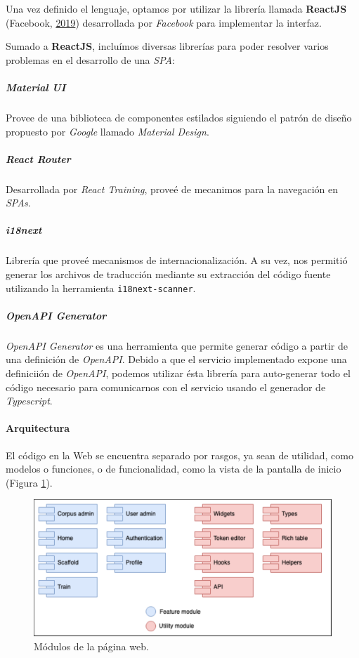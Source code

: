 \documentclass[12pt,a4paper,]{scrartcl}
\let\oldparagraph\paragraph
\renewcommand{\paragraph}[1]{\oldparagraph{#1}\mbox{}}
\let\oldsubparagraph\subparagraph
\renewcommand{\subparagraph}[1]{\oldsubparagraph{#1}\mbox{}}
\begin{document}
Una vez definido el lenguaje, optamos por utilizar la librería llamada \textbf{ReactJS} (Facebook, \protect\hyperlink{ref-react}{2019}) desarrollada por \emph{Facebook} para implementar la interfaz.

Sumado a \textbf{ReactJS}, incluímos diversas librerías para poder resolver varios problemas en el desarrollo de una \emph{SPA}:

\hypertarget{material-ui}{%
\subparagraph{Material UI}\label{material-ui}}

Provee de una biblioteca de componentes estilados siguiendo el patrón de diseño propuesto por \emph{Google} llamado \emph{Material Design}.

\hypertarget{react-router}{%
\subparagraph{React Router}\label{react-router}}

Desarrollada por \emph{React Training}, proveé de mecanimos para la navegación en \emph{SPAs}.

\hypertarget{i18next}{%
\subparagraph{i18next}\label{i18next}}

Librería que proveé mecanismos de internacionalización. A su vez, nos permitió generar los archivos de traducción mediante su extracción del código fuente utilizando la herramienta \texttt{i18next-scanner}.

\hypertarget{openapi-generator}{%
\subparagraph{OpenAPI Generator}\label{openapi-generator}}

\emph{OpenAPI Generator} es una herramienta que permite generar código a partir de una definición de \emph{OpenAPI}.
Debido a que el servicio implementado expone una definiciión de \emph{OpenAPI}, podemos utilizar ésta librería para auto-generar todo el código necesario para comunicarnos con el servicio usando el generador de \emph{Typescript}.

\hypertarget{arquitectura}{%
\paragraph{Arquitectura}\label{arquitectura}}

El código en la Web se encuentra separado por rasgos, ya sean de utilidad, como modelos o funciones, o de funcionalidad, como la vista de la pantalla de inicio (Figura \ref{fig:developer-web-modules}).

\begin{figure}[H]

{\centering \includegraphics{assets/developer/web-modules.pdf} 

}

\caption{Módulos de la página web.}\label{fig:developer-web-modules}
\end{figure}
\end{document}
